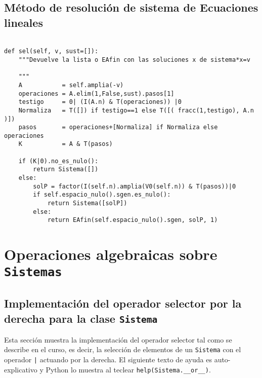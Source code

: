 \documentclass[11pt]{report}
\begin{document}
\subsection{Método de resolución de sistema de Ecuaciones lineales}
\label{sec:org50091b6}
\begin{verbatim}

def sel(self, v, sust=[]):
    """Devuelve la lista o EAfin con las soluciones x de sistema*x=v

    """
    A           = self.amplia(-v)
    operaciones = A.elim(1,False,sust).pasos[1]
    testigo     = 0| (I(A.n) & T(operaciones)) |0
    Normaliza   = T([]) if testigo==1 else T([( fracc(1,testigo), A.n )])
    pasos       = operaciones+[Normaliza] if Normaliza else operaciones
    K           = A & T(pasos)
    
    if (K|0).no_es_nulo():
        return Sistema([])
    else:
        solP = factor(I(self.n).amplia(V0(self.n)) & T(pasos))|0
        if self.espacio_nulo().sgen.es_nulo():
            return Sistema([solP])
        else:
            return EAfin(self.espacio_nulo().sgen, solP, 1)

\end{verbatim}

\section{Operaciones algebraicas sobre \texttt{Sistemas}}
\label{sec:org060cfaf}

\subsection{Implementación del operador selector por la derecha para la clase \texttt{Sistema}}
\label{sec:orge58ae10}

Esta sección muestra la implementación del operador selector tal como
se describe en el curso, es decir, la selección de elementos de un
\texttt{Sistema} con el operador \texttt{|} actuando por la derecha. El siguiente
texto de ayuda es auto-explicativo y Python lo muestra al teclear
\texttt{help(Sistema.\_\_or\_\_)}.
\end{document}
